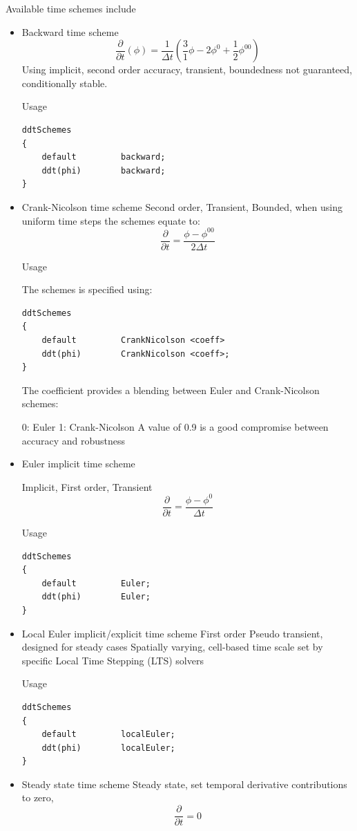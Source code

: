 \documentclass{article}
\begin{document}
Available time schemes include
\begin{itemize}
\item Backward time scheme
\begin{equation}
\frac{\partial}{\partial t}(\phi) = \frac{1}{\Delta t}(\frac{3}{1}\phi - 2\phi^0 + \frac{1}{2} \phi^{00})
\end{equation}
Using implicit, second order accuracy, transient, boundedness not guaranteed, conditionally stable. 

Usage 

\begin{verbatim}
ddtSchemes
{
    default         backward;
    ddt(phi)        backward;
}
\end{verbatim}

\item Crank-Nicolson time scheme
Second order, Transient, Bounded, when using uniform time steps the schemes equate to: 
\begin{equation}
\frac{\partial}{\partial t} = \frac{\phi - \phi^{00}}{2\Delta t}
\end{equation}

Usage

The schemes is specified using: 

\begin{verbatim}
ddtSchemes
{
    default         CrankNicolson <coeff>
    ddt(phi)        CrankNicolson <coeff>;
}
\end{verbatim}

The coefficient provides a blending between Euler and Crank-Nicolson schemes:

0: Euler
1: Crank-Nicolson
A value of 0.9 is a good compromise between accuracy and robustness

\item Euler implicit time scheme

Implicit, First order, Transient 
\begin{equation}
\frac{\partial}{\partial t} = \frac{\phi - \phi^0}{\Delta t}
\end{equation}

Usage

\begin{verbatim}
ddtSchemes
{
    default         Euler;
    ddt(phi)        Euler;
}
\end{verbatim}


\item Local Euler implicit/explicit time scheme
First order
Pseudo transient, designed for steady cases
Spatially varying, cell-based time scale set by specific Local Time Stepping (LTS) solvers

Usage

\begin{verbatim}
ddtSchemes
{
    default         localEuler;
    ddt(phi)        localEuler;
}
\end{verbatim}

\item Steady state time scheme
Steady state, set temporal derivative contributions to zero, 
\begin{equation}
\frac{\partial}{\partial t} = 0
\end{equation}
\end{itemize}
\end{document}
